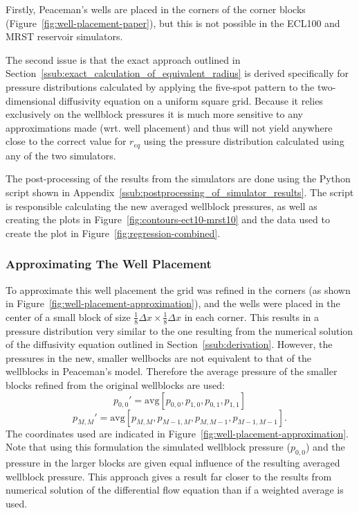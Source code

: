 Firstly, Peaceman's wells are placed in the corners of the corner blocks (Figure~\ref{fig:well-placement-paper}), but this is not possible in the ECL100 and MRST reservoir simulators.

The second issue is that the exact approach outlined in Section~\ref{ssub:exact_calculation_of_equivalent_radius} is derived specifically for pressure distributions calculated by applying the five-spot pattern to the two-dimensional diffusivity equation on a uniform square grid. Because it relies exclusively on the wellblock pressures it is much more sensitive to any approximations made (wrt. well placement) and thus will not yield anywhere close to the correct value for $r_{eq}$ using the pressure distribution calculated using any of the two simulators.

The post-processing of the results from the simulators are done using the Python script shown in Appendix~\ref{ssub:postprocessing_of_simulator_results}. The script is responsible calculating the new averaged wellblock pressures, as well as creating the plots in Figure~\ref{fig:contours-ect10-mrst10} and the data used to create the plot in Figure~\ref{fig:regression-combined}.

\subsubsection{Approximating The Well Placement} %
\label{ssub:approximating_the_well_placement}

To approximate this well placement the grid was refined in the corners (as shown in Figure~\ref{fig:well-placement-approximation}), and the wells were placed in the center of a small block of size $\frac{1}{8}\Delta x\times \frac{1}{8}\Delta x$ in each corner. This results in a pressure distribution very similar to the one resulting from the numerical solution of the diffusivity equation outlined in Section~\ref{ssub:derivation}. However, the pressures in the new, smaller wellbocks are not equivalent to that of the wellblocks in Peaceman's model. Therefore the average pressure of the smaller blocks refined from the original wellblocks are used:
\begin{equation}
    p_{0,0}' = \mathrm{avg}\left[ p_{0,0}, p_{1,0}, p_{0,1}, p_{1,1} \right]
\end{equation}
\begin{equation}
    p_{M,M}' = \mathrm{avg}\left[ p_{M,M}, p_{M-1,M}, p_{M,M-1}, p_{M-1,M-1} \right].
\end{equation}
The coordinates used are indicated in Figure~\ref{fig:well-placement-approximation}. Note that using this formulation the simulated wellblock pressure ($p_{0,0}$) and the pressure in the larger blocks are given equal influence of the resulting averaged wellblock pressure. This approach gives a result far closer to the results from numerical solution of the differential flow equation than if a weighted average is used.

